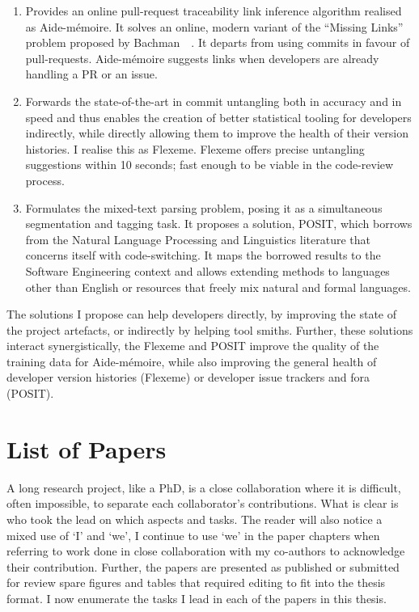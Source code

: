 \begin{enumerate}
    \item Provides an online pull-request traceability link inference algorithm
    realised as Aide-mémoire. It solves an online, modern variant of the
    ``Missing Links'' problem proposed by Bachman~\etal~\cite{MissingLinks}. It
    departs from using commits in favour of pull-requests. Aide-mémoire suggests
    links when developers are already handling a PR or an issue.

    \item Forwards the state-of-the-art in commit untangling both in accuracy
    and in speed and thus enables the creation of better statistical tooling for
    developers indirectly, while directly allowing them to improve the health of
    their version histories. I realise this as Flexeme. Flexeme offers precise
    untangling suggestions within 10 seconds; fast enough to be viable in the
    code-review process.

    \item Formulates the mixed-text parsing problem, posing it as a simultaneous
    segmentation and tagging task. It proposes a solution, POSIT, which borrows
    from the Natural Language Processing and Linguistics literature that
    concerns itself with code-switching. It maps the borrowed results to the
    Software Engineering context and allows extending methods to languages other
    than English or resources that freely mix natural and formal languages.
\end{enumerate}

The solutions I propose can help developers directly, by improving the state of
the project artefacts, or indirectly by helping tool smiths. Further, these
solutions interact synergistically, the Flexeme and POSIT improve the quality of
the training data for Aide-mémoire, while also improving the general health of
developer version histories (Flexeme) or developer issue trackers and fora
(POSIT).

\section{List of Papers}
\label{chapter:introduction:sec:papers}

A long research project, like a PhD, is a close collaboration where it is
difficult, often impossible, to separate each collaborator's contributions. What
is clear is who took the lead on which aspects and tasks. The reader will also
notice a mixed use of `I' and `we', I continue to use `we' in the paper chapters
when referring to work done in close collaboration with my co-authors to
acknowledge their contribution. Further, the papers are presented as published
or submitted for review spare figures and tables that required editing to fit
into the thesis format. I now enumerate the tasks I lead in each of the papers
in this thesis.

